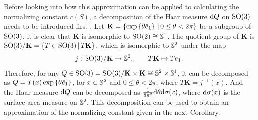 Before looking into how this approximation can be applied to calculating the normalizing constant $c(S)$, a decomposition of the Haar measure $\mathrm{d} Q$ on $\mathrm{SO}(3)$ needs to be introduced first \cite[Chapter 4]{dym1972fourier}.
Let $\mathbf{K} = \{\exp\left\{ \theta\hat{e}_1 \right\} \,|\, 0\leq \theta < 2\pi\}$ be a subgroup of $\mathrm{SO}(3)$, it is clear that $\mathbf{K}$ is isomorphic to $\mathrm{SO}(2) \cong \mathbb{S}^1$.
The quotient group of $\mathbf{K}$ is $\mathrm{SO}(3)/\mathbf{K} = \{ T\in\mathrm{SO}(3) \,|\, T\mathbf{K} \}$, which is isomorphic to $\mathbb{S}^2$ under the map
\begin{align} \label{eqn:SO3-SO3/K}
	j:\, \mathrm{SO}(3)/\mathbf{K} \to \mathbb{S}^2, \qquad T\mathbf{K} \mapsto Te_1.
\end{align}
Therefore, for any $Q\in\mathrm{SO}(3) = \mathrm{SO}(3)/\mathbf{K} \times \mathbf{K} \cong \mathbb{S}^2\times \mathbb{S}^1$, it can be decomposed as $Q = T(x) \exp\left\{ \theta\hat{e}_1 \right\}$,
for $x\in\mathbb{S}^2$ and $0\leq \theta< 2\pi$, where $T\mathbf{K} = j^{-1}(x)$.
And the Haar measure $\mathrm{d}{Q}$ can be decomposed as $\tfrac{1}{8\pi^2} \mathrm{d} \theta \mathrm{d} \sigma(x)$, where $\mathrm{d} \sigma(x)$ is the surface area measure on $\mathbb{S}^2$.
This decomposition can be used to obtain an approximation of the normalizing constant given in the next Corollary.

